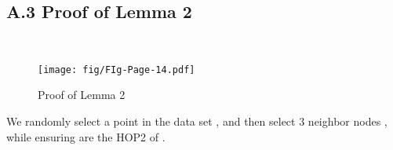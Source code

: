 
\clearpage

\subsection{A.3 Proof of Lemma 2}
\label{app_proof_3}

\ 






\noindent{}





































































\begin{figure}[t]
  \centering
  \texttt{[image: fig/FIg-Page-14.pdf]}
  \caption{Proof of Lemma 2}
  \label{fig:appendix_lemma2}
\end{figure}

We randomly select a point  in the data set , and then select 3 neighbor nodes , while ensuring   are the HOP2 of .

